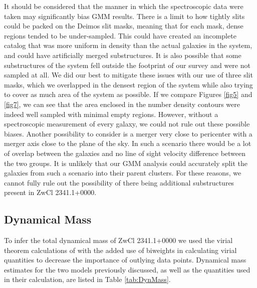\documentclass[onecolumn]{aastex}
\begin{document}
It should be considered that the manner in which the spectroscopic data were taken may significantly bias GMM results.  There is a limit to how tightly slits could be packed on the Deimos slit masks, meaning that for each mask, dense regions tended to be under-sampled.  This could have created an incomplete catalog that was more uniform in density than the actual galaxies in the system, and could have artificially merged substructures.  It is also possible that some substructures of the system fell outside the footprint of our survey and were not sampled at all.  We did our best to mitigate these issues with our use of three slit masks, which we overlapped in the densest region of the system while also trying to cover as much area of the system as possible.  If we compare Figures \ref{fig5} and \ref{fig7}, we can see that the area enclosed in the number density contours were indeed well sampled with minimal empty regions.  However, without a spectroscopic measurement of every galaxy, we could not rule out these possible biases.  Another possibility to consider is a merger very close to pericenter with a merger axis close to the plane of the sky.  In such a scenario there would be a lot of overlap between the galaxies and no line of sight velocity difference between the two groups.  It is unlikely that our GMM analysis could accurately split the galaxies from such a scenario into their parent clusters.  For these reasons, we cannot fully rule out the possibility of there being additional substructures present in ZwCl 2341.1+0000.

\subsection{Dynamical Mass}
To infer the total dynamical mass of ZwCl 2341.1+0000 we used the virial theorem calculations of \cite{Girardi98,Girardi01} with the added use of biweights \citep{Beers90} in calculating virial quantities to decrease the importance of outlying data points.  Dynamical mass estimates for the two models previously discussed, as well as the quantities used in their calculation, are listed in Table \ref{tab:DynMass}.
\end{document}
